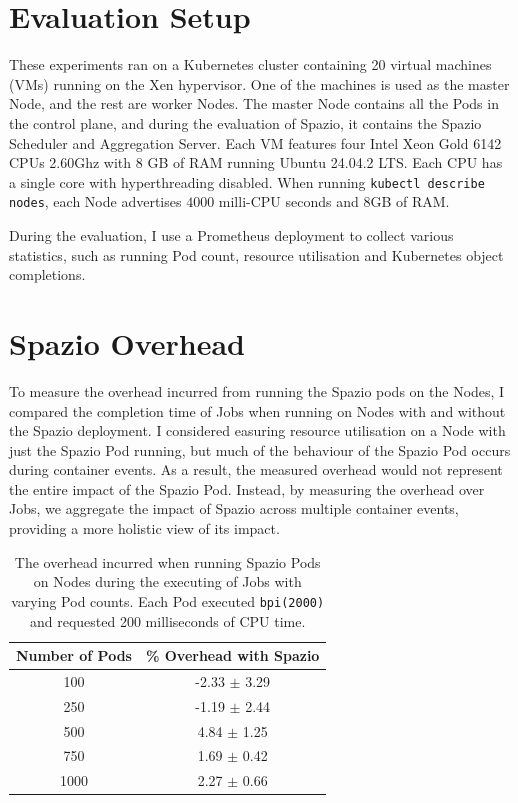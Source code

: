 \section{Evaluation Setup}
These experiments ran on a Kubernetes cluster containing 20 virtual machines
(VMs) running on the Xen hypervisor. One of the machines is used as the master
Node, and the rest are worker Nodes. The master Node contains all the Pods in
the control plane, and during the evaluation of Spazio, it contains the Spazio
Scheduler and Aggregation Server. Each VM features four Intel Xeon Gold 6142
CPUs \@ 2.60Ghz with 8 GB of RAM running Ubuntu 24.04.2 LTS. Each CPU has a
single core with hyperthreading disabled. When running \texttt{kubectl describe
nodes}, each Node advertises $4000$ milli-CPU seconds and 8GB of RAM.

During the evaluation, I use a Prometheus deployment \cite{} to collect various
statistics, such as running Pod count, resource utilisation and Kubernetes
object completions.

\section{Spazio Overhead}
\label{sec:eval-overhead}
To measure the overhead incurred from running the Spazio pods on the Nodes, I
compared the completion time of Jobs when running on Nodes with and without the
Spazio deployment. I considered easuring resource utilisation on a Node with
just the Spazio Pod running, but much of the behaviour of the
Spazio Pod occurs during container events. As a result, the measured overhead
would not represent the entire impact of the Spazio Pod. Instead, by measuring
the overhead over Jobs, we aggregate the impact of Spazio across multiple
container events, providing a more holistic view of its impact.

\begin{table}[H]
\centering
    \begin{tabular}{|c|c|}
    \hline
    \textbf{Number of Pods} & \textbf{\% Overhead with Spazio} \\
    \hline
        100 & -2.33 $\pm$ 3.29 \\
        250 & -1.19 $\pm$ 2.44 \\
        500 & 4.84  $\pm$ 1.25 \\
        750 & 1.69  $\pm$ 0.42 \\
        1000 & 2.27  $\pm$ 0.66 \\
    \hline
    \end{tabular}
    \label{tab:overhead}
    \caption{The overhead incurred when running Spazio Pods on Nodes during the
    executing of Jobs with varying Pod counts. Each Pod executed
    \texttt{bpi(2000)} and requested 200 milliseconds of CPU time.}
\end{table}


